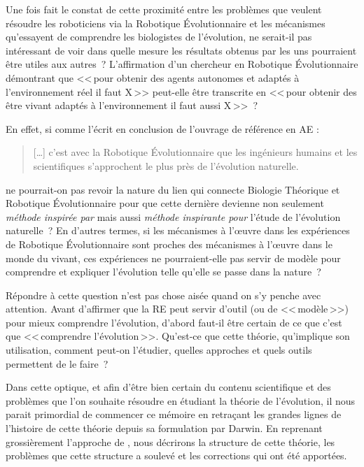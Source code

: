 Une fois fait le constat de cette proximité entre les problèmes que veulent résoudre les roboticiens via la Robotique \'Evolutionnaire et les mécanismes qu'essayent de comprendre les biologistes de l'évolution, ne serait-il pas intéressant de voir dans quelle mesure les résultats obtenus par les uns pourraient être utiles aux autres~? L'affirmation d'un chercheur en Robotique \'Evolutionnaire démontrant que <<\,pour obtenir des agents autonomes et adaptés à l'environnement réel il faut X\,>> peut-elle être transcrite en <<\,pour obtenir des être vivant adaptés à l'environnement il faut aussi X\,>>~?

En effet, si comme l'écrit \citet{eiben03introductiontoevolutionarycomputing} en conclusion de l'ouvrage de référence en AE :
\begin{quote}
   [\ldots] c'est avec la Robotique \'Evolutionnaire que les ingénieurs humains et les scientifiques s'approchent le plus près de l'évolution naturelle.\\
   \citep[p. 264]{eiben03introductiontoevolutionarycomputing}
\end{quote}
ne pourrait-on pas revoir la nature du lien qui connecte Biologie Théorique et Robotique \'Evolutionnaire pour que cette dernière devienne non seulement \emph{méthode inspirée par} mais aussi \emph{méthode inspirante pour} l'étude de l'évolution naturelle~? En d'autres termes, si les mécanismes à l'\oe uvre dans les expériences de Robotique \'Evolutionnaire sont proches des mécanismes à l'\oe uvre dans le monde du vivant, ces expériences ne pourraient-elle pas servir de modèle pour comprendre et expliquer l'évolution telle qu'elle se passe dans la nature~?

Répondre à cette question n'est pas chose aisée quand on s'y penche avec attention. Avant d'affirmer que la RE peut servir d'outil (ou de <<\,modèle\,>>) pour mieux comprendre l'évolution, d'abord faut-il être certain de ce que c'est que <<\,comprendre l'évolution\,>>. Qu'est-ce que cette théorie, qu'implique son utilisation, comment peut-on l'étudier, quelles approches et quels outils permettent de le faire~?

Dans cette optique, et afin d'être bien certain du contenu scientifique et des problèmes que l'on souhaite résoudre en étudiant la théorie de l'évolution, il nous parait primordial de commencer ce mémoire en retraçant les grandes lignes de l'histoire de cette théorie depuis sa formulation par Darwin. En reprenant grossièrement l'approche de \citep{gayon1991darwinetlapresdarwin}, nous décrirons la structure de cette théorie, les problèmes que cette structure a soulevé et les corrections qui ont été apportées.

